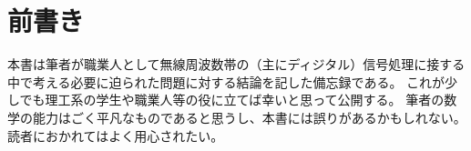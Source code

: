 \part{前書き}
    本書は筆者が職業人として無線周波数帯の（主にディジタル）信号処理に接する中で考える必要に迫られた問題に対する結論を記した備忘録である。
    これが少しでも理工系の学生や職業人等の役に立てば幸いと思って公開する。
    筆者の数学の能力はごく平凡なものであると思うし、本書には誤りがあるかもしれない。
    読者におかれてはよく用心されたい。
